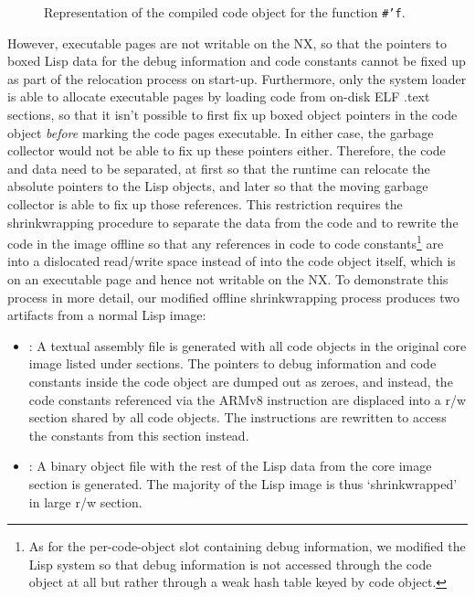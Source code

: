 \documentclass[format=sigconf]{acmart}
\begin{document}
\begin{figure}[h]
  \label{fig:before-shrinkwrap}
  \centering
  
  \caption{Representation of the compiled code object for the function
    \protect\texttt{\#'f}.}
\end{figure}

However, executable pages are not writable on the NX, so that the pointers to boxed Lisp data for the debug information and code constants cannot be fixed up as part of the relocation process on start-up. Furthermore, only the system loader is able to allocate executable pages by loading code from on-disk ELF .text sections, so that it isn't possible to first fix up boxed object pointers in the code object \emph{before} marking the code pages executable. In either case, the garbage collector would not be able to fix up these pointers either. Therefore, the code and data need to be separated, at first so that the runtime can relocate the absolute pointers to the Lisp objects, and later so that the moving garbage collector is able to fix up those references. This restriction requires the shrinkwrapping procedure to separate the data from the code and to rewrite the code in the image offline so that any references in code to code constants\footnote{As for the per-code-object slot containing debug information, we modified the Lisp system so that debug information is not accessed through the code object at all but rather through a weak hash table keyed by code object.} are into a dislocated read/write space instead of into the code object itself, which is on an executable page and hence not writable on the NX. To demonstrate this process in more detail, our modified offline shrinkwrapping process produces two artifacts from a normal Lisp image:

\begin{itemize}
\item {}: A textual assembly file is generated with all code objects in the original core image listed under  sections. The pointers to debug information and code constants inside the code object are dumped out as zeroes, and instead, the code constants referenced via the ARMv8  instruction are displaced into a r/w  section shared by all code objects. The  instructions are rewritten to access the constants from this section instead.
\item {}: A binary object file with the rest of the Lisp data from the core image section is generated. The majority of the Lisp image is thus `shrinkwrapped' in large r/w  section.
\end{itemize}
\end{document}
